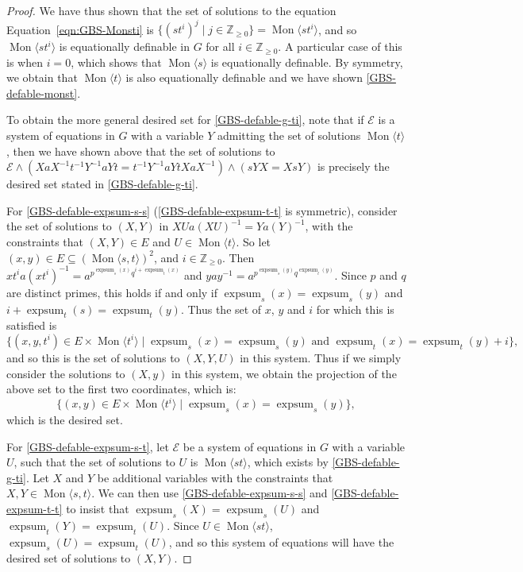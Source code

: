 \documentclass[10pt,a4paper]{amsart}
\DeclareMathOperator{\Mon}{Mon}
\newcommand{\Z}{\mathbb{Z}}
\DeclareMathOperator{\expsum}{expsum}
\begin{document}
\begin{proof}
We have thus shown that the set of solutions to the equation
			Equation~\eqref{eqn:GBS-Monsti} is \(\{(st^i)^j \mid j \in \Z_{\geq 0}\} =
			\Mon \langle st^i \rangle\), and so \(\Mon\langle st^i \rangle\) is
			equationally definable in \(G\) for all \(i \in \Z_{\geq 0}\). A
			particular case of this is when \(i = 0\), which shows that
			\(\Mon \langle s \rangle\) is equationally definable. By
			symmetry, we obtain that \(\Mon \langle t \rangle\) is also
			equationally definable and we have shown \eqref{GBS-defable-monst}.

			To obtain the more
			general desired set for \eqref{GBS-defable-g-ti}, note that if \(\mathcal E\) is a
			system of equations in \(G\) with a variable \(Y\) admitting the
			set of solutions \(\Mon\langle t \rangle\), then we have shown
			above that the set of solutions to \(\mathcal E \wedge (XaX^{-1}
			t^{-1} Y^{-1} a Y t = t^{-1} Y^{-1} a Y t XaX^{-1}) \wedge (sY X =
			XsY)\) is precisely the desired set stated in \eqref{GBS-defable-g-ti}.

For \eqref{GBS-defable-expsum-s-s} (\eqref{GBS-defable-expsum-t-t}
			is symmetric), consider the set of solutions to \((X, Y)\) in \( X
			U a(XU)^{-1} = Y a (Y)^{-1}\), with the constraints that \((X, Y)
			\in E\) and \(U \in \Mon \langle t \rangle\).  So let \((x, y) \in
			E \subseteq (\Mon \langle s, t \rangle)^2\), and \(i \in \Z_{\geq
			0}\). Then \(xt^i a (xt^i)^{-1} = a^{p^{\expsum_s(x)}q^{i +
			\expsum_t(x)}}\) and \(y a y^{-1} = a^{p^{\expsum_s(y)}
			q^{\expsum_t(y)}}\). Since \(p\) and \(q\) are distinct primes,
			this holds if and only if \(\expsum_s(x) = \expsum_s(y)\) and \(i +
			\expsum_t(s) = \expsum_t(y)\).  Thus the set of \(x\), \(y\) and
			\(i\) for which this is satisfied is
			\[
				\{(x, y, t^i) \in E \times \Mon\langle t^i \rangle \mid
				\expsum_s(x) = \expsum_s(y) \text{ and } \expsum_t(x) =
		\expsum_t(y) + i\},
			\]
			and so this is the set of solutions to \((X, Y, U)\) in this system.
			Thus if we simply consider the solutions to \((X, y)\) in this
			system, we obtain the projection of the above set to the first two
			coordinates, which is:
			\[
				\{(x, y) \in E \times \Mon\langle t^i \rangle \mid
		\expsum_s(x) = \expsum_s(y)\},
			\]
	which is the desired set.
			
	For \eqref{GBS-defable-expsum-s-t}, let \(\mathcal E\) be a system of equations in \(G\) with
			a variable \(U\), such that the set of solutions to \(U\) is \(\Mon
			\langle st \rangle\), which exists by \eqref{GBS-defable-g-ti}.  Let \(X\) and \(Y\) be
			additional variables with the constraints that \(X, Y \in \Mon
			\langle s, t \rangle\). We can then use \eqref{GBS-defable-expsum-s-s} and \eqref{GBS-defable-expsum-t-t} to insist
			that \(\expsum_s(X) = \expsum_s(U)\) and \(\expsum_t(Y) = 
			\expsum_t(U)\). Since \(U \in \Mon\langle st \rangle\),
			\(\expsum_s(U) = \expsum_t(U)\), and so this system of
			equations will have the desired set of solutions to
			\((X, Y)\).
	\end{proof}
\end{document}
